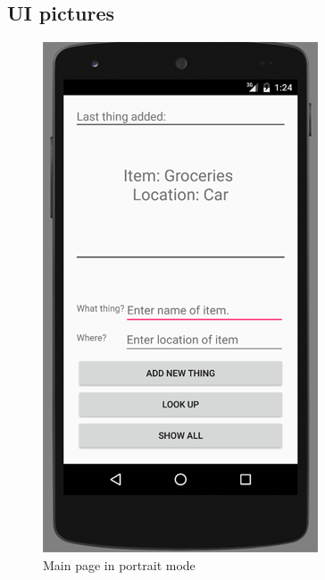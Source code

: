 \documentclass{article}
\begin{document}
\subsection{UI pictures}
\begin{figure}[h!]
	\centering
	\includegraphics[scale=0.7]{"portraitMode"}
	\caption{Main page in portrait mode}
	\label{fig:mainpagePortrait}
\end{figure}
\end{document}
